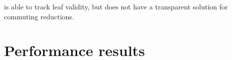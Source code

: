 
 is able to track leaf validity, but does not have a transparent solution for commuting reductions.


\section{Performance results}

